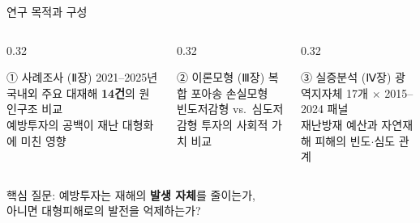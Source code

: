 \documentclass[aspectratio=169,10pt]{beamer}
\begin{document}
\begin{frame}{연구 목적과 구성}
  \begin{columns}[T]
    \begin{column}{0.32\textwidth}
      \begin{block}{① 사례조사 (Ⅱ장)}
        2021--2025년 국내외 주요 대재해 \textbf{14건}의 원인구조 비교\\[3pt]
        \small 예방투자의 공백이 재난 대형화에 미친 영향
      \end{block}
    \end{column}
    \begin{column}{0.32\textwidth}
      \begin{block}{② 이론모형 (Ⅲ장)}
        복합 포아송 손실모형\\[3pt]
        \small 빈도저감형 vs.\ 심도저감형 투자의 사회적 가치 비교
      \end{block}
    \end{column}
    \begin{column}{0.32\textwidth}
      \begin{block}{③ 실증분석 (Ⅳ장)}
        광역지자체 17개 $\times$ 2015--2024 패널\\[3pt]
        \small 재난방재 예산과 자연재해 피해의 빈도$\cdot$심도 관계
      \end{block}
    \end{column}
  \end{columns}
  \vspace{1em}
  \begin{center}
    핵심 질문: 예방투자는 재해의 \textbf{발생 자체}를 줄이는가,\\
    아니면 \alert{대형피해로의 발전}을 억제하는가?
  \end{center}
\end{frame}
\end{document}
